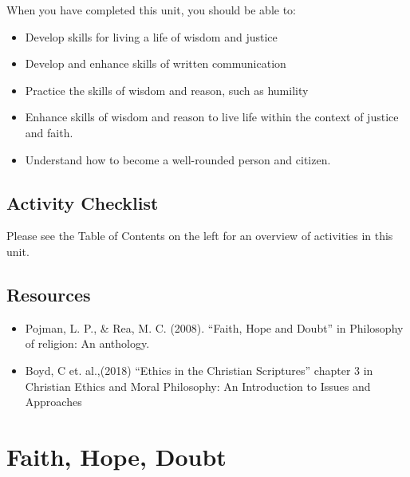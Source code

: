 \documentclass[
]{book}
\providecommand{\tightlist}{%
  \setlength{\itemsep}{0pt}\setlength{\parskip}{0pt}}
\begin{document}
When you have completed this unit, you should be able to:

\begin{itemize}
\tightlist
\item
  Develop skills for living a life of wisdom and justice\\
\item
  Develop and enhance skills of written communication\\
\item
  Practice the skills of wisdom and reason, such as humility\\
\item
  Enhance skills of wisdom and reason to live life within the context of justice and faith.\\
\item
  Understand how to become a well-rounded person and citizen.
\end{itemize}

\hypertarget{activity-checklist-2}{%
\subsection*{Activity Checklist}\label{activity-checklist-2}}

Please see the Table of Contents on the left for an overview of activities in this unit.

\hypertarget{resources-2}{%
\subsection*{Resources}\label{resources-2}}

\begin{itemize}
\tightlist
\item
  Pojman, L. P., \& Rea, M. C. (2008). ``Faith, Hope and Doubt'' in Philosophy of religion: An anthology.\\
\item
  Boyd, C et. al.,(2018) ``Ethics in the Christian Scriptures'' chapter 3 in Christian Ethics and Moral Philosophy: An Introduction to Issues and Approaches
\end{itemize}

\hypertarget{faith-hope-doubt}{%
\section{Faith, Hope, Doubt}\label{faith-hope-doubt}}
\end{document}
